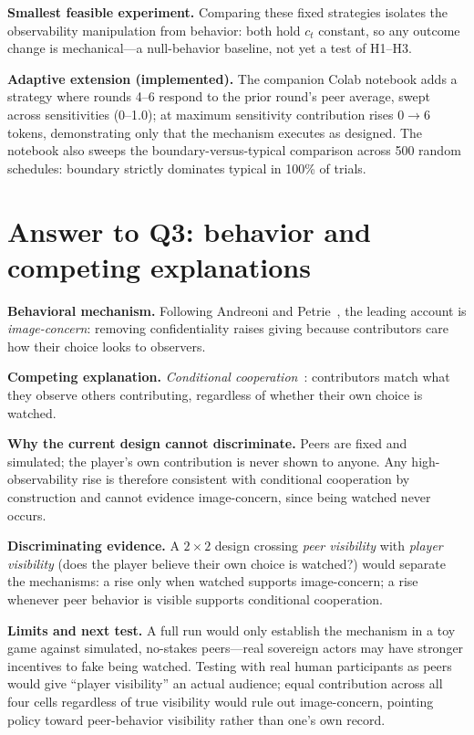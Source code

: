 \textbf{Smallest feasible experiment.} Comparing these fixed strategies isolates the observability manipulation from behavior: both hold $c_t$ constant, so any outcome change is mechanical---a null-behavior baseline, not yet a test of H1--H3.

\textbf{Adaptive extension (implemented).} The companion Colab notebook adds a strategy where rounds 4--6 respond to the prior round's peer average, swept across sensitivities (0--1.0); at maximum sensitivity contribution rises 0$\to$6 tokens, demonstrating only that the mechanism executes as designed. The notebook also sweeps the boundary-versus-typical comparison across 500 random schedules: boundary strictly dominates typical in 100\% of trials.

\section{Answer to Q3: behavior and competing explanations}
\textbf{Behavioral mechanism.} Following Andreoni and Petrie~\cite{andreoni2004}, the leading account is \emph{image-concern}: removing confidentiality raises giving because contributors care how their choice looks to observers.

\textbf{Competing explanation.} \emph{Conditional cooperation}~\cite{fischbacher2001}: contributors match what they observe others contributing, regardless of whether their own choice is watched.

\textbf{Why the current design cannot discriminate.} Peers are fixed and simulated; the player's own contribution is never shown to anyone. Any high-observability rise is therefore consistent with conditional cooperation by construction and cannot evidence image-concern, since being watched never occurs.

\textbf{Discriminating evidence.} A $2\times2$ design crossing \emph{peer visibility} with \emph{player visibility} (does the player believe their own choice is watched?) would separate the mechanisms: a rise only when watched supports image-concern; a rise whenever peer behavior is visible supports conditional cooperation.

\textbf{Limits and next test.} A full run would only establish the mechanism in a toy game against simulated, no-stakes peers---real sovereign actors may have stronger incentives to fake being watched. Testing with real human participants as peers would give ``player visibility'' an actual audience; equal contribution across all four cells regardless of true visibility would rule out image-concern, pointing policy toward peer-behavior visibility rather than one's own record.

